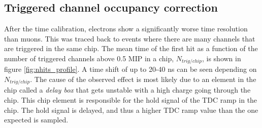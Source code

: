 \documentclass{JINST}
\begin{document}
\subsection{Triggered channel occupancy correction}
\label{sec:NumberTrigger}

After the time calibration, electrons show a significantly worse time resolution than muons. This was traced back to events where there are many channels that are triggered in the same chip. The mean time of the first hit as a function of the number of triggered channels above 0.5 MIP in a chip, $N_{trig/chip}$, is shown in figure \ref{fig:nhits_profile}. A time shift of up to 20-40 ns can be seen depending on  $N_{trig/chip}$. The cause of the observed effect is most likely due to an element in the chip called a \textit{delay box} that gets unstable with a high charge going through the chip. This chip element is responsible for the hold signal of the TDC ramp in the chip. The hold signal is delayed, and thus a higher TDC ramp value than the one expected is sampled.
\end{document}
